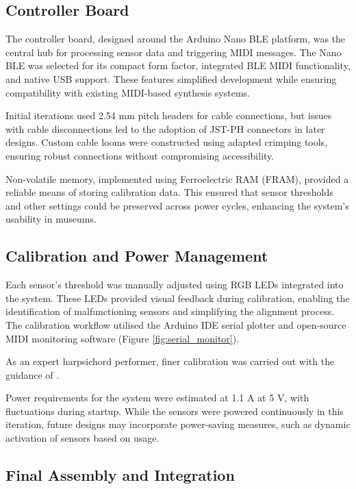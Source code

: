 \subsection{Controller Board}\label{controller-board}

The controller board, designed around the Arduino Nano BLE platform, was the central hub for processing sensor data and triggering MIDI messages. The Nano BLE was selected for its compact form factor, integrated BLE MIDI functionality, and native USB support. These features simplified development while ensuring compatibility with existing MIDI-based synthesis systems.

Initial iterations used 2.54 mm pitch headers for cable connections, but issues with cable disconnections led to the adoption of JST-PH connectors in later designs. Custom cable looms were constructed using adapted crimping tools, ensuring robust connections without compromising accessibility.

Non-volatile memory, implemented using Ferroelectric RAM (FRAM), provided a reliable means of storing calibration data. This ensured that sensor thresholds and other settings could be preserved across power cycles, enhancing the system's usability in museums.

\subsection{Calibration and Power Management}\label{calibration}

Each sensor's threshold was manually adjusted using RGB LEDs integrated into the system. These LEDs provided visual feedback during calibration, enabling the identification of malfunctioning sensors and simplifying the alignment process. The calibration workflow utilised the Arduino IDE serial plotter and open-source MIDI monitoring software (Figure \ref{fig:serial_monitor}). 


As an expert harpsichord performer, finer calibration was carried out with the guidance of .

Power requirements for the system were estimated at 1.1 A at 5 V, with fluctuations during startup. While the sensors were powered continuously in this iteration, future designs may incorporate power-saving measures, such as dynamic activation of sensors based on usage.

\subsection{Final Assembly and Integration}

